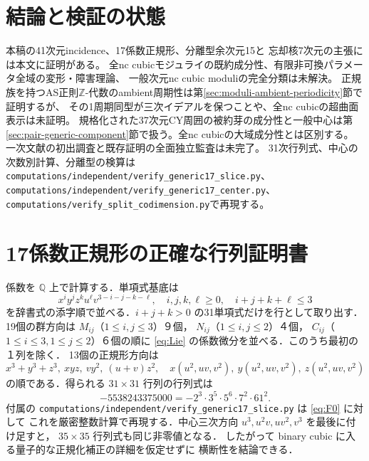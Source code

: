 \documentclass[11pt,a4paper]{ltjsarticle}
\numberwithin{equation}{section}
\begin{document}
\section{結論と検証の状態}\label{sec:status}
本稿の41次元incidence、17係数正規形、分離型余次元15と
忘却核7次元の主張には本文に証明がある。
全nc cubicモジュライの既約成分性、有限非可換パラメータ全域の変形・障害理論、
一般次元nc cubic moduliの完全分類は未解決。
正規族を持つAS正則$\mathbb Z$-代数のambient周期性は第\ref{sec:moduli-ambient-periodicity}節で証明するが、
その1周期同型が三次イデアルを保つことや、全nc cubicの超曲面表示は未証明。
規格化された37次元CY周囲の被約芽の成分性と一般中心は第\ref{sec:pair-generic-component}節で扱う。全nc cubicの大域成分性とは区別する。
一次文献の初出調査と既存証明の全面独立監査は未完了。
31次行列式、中心の次数別計算、分離型の検算は
\nolinkurl{computations/independent/verify_generic17_slice.py}、
\nolinkurl{computations/independent/verify_generic17_center.py}、
\nolinkurl{computations/verify_split_codimension.py}で再現する。

\appendix
\section{17係数正規形の正確な行列証明書}\label{app:rank}
係数を $\mathbb Q$ 上で計算する．単項式基底は
\[
 x^iy^jz^ku^\ell v^{3-i-j-k-\ell},\quad
 i,j,k,\ell\ge0,\quad i+j+k+\ell\le3
\]
を辞書式の添字順で並べる．$i+j+k>0$ の31単項式だけを行として取り出す．
19個の群方向は $M_{ij}$（$1\le i,j\le3$）９個，
$N_{ij}$（$1\le i,j\le2$）４個，
$C_{ij}$（$1\le i\le3,1\le j\le2$）６個の順に
\eqref{eq:Lie} の係数微分を並べる．このうち最初の１列を除く．
13個の正規形方向は
\[
 x^3+y^3+z^3,\ xyz,\ vy^2,\ (u+v)z^2,\quad
 x(u^2,uv,v^2),\ y(u^2,uv,v^2),\ z(u^2,uv,v^2)
\]
の順である．得られる $31\times31$ 行列の行列式は
\[
 -5538243375000=-2^3\cdot3^5\cdot5^6\cdot7^2\cdot61^2.
\]
付属の \nolinkurl{computations/independent/verify_generic17_slice.py} は \eqref{eq:F0} に対して
これを厳密整数計算で再現する．中心三次方向
$u^3,u^2v,uv^2,v^3$ を最後に付け足すと，
$35\times35$ 行列式も同じ非零値となる．
したがって binary cubic に入る量子的な正規化補正の詳細を仮定せずに
横断性を結論できる．
\end{document}
